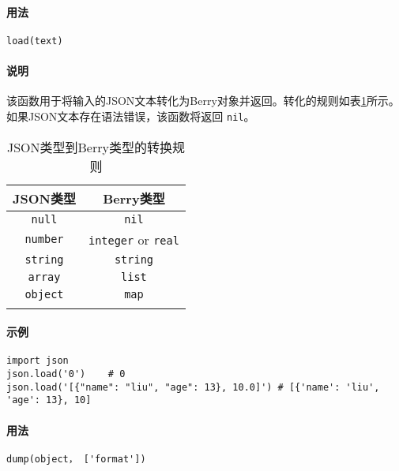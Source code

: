 \paragraph{用法}
\begin{lstlisting}[language=berry, numbers=none]
load(text)
\end{lstlisting}

\paragraph{说明}
该函数用于将输入的JSON文本转化为Berry对象并返回。转化的规则如表\ref{tab::json2berry_rule}所示。如果JSON文本存在语法错误，该函数将返回 \texttt{nil}。
\begin{table}[htb]
    \centering
    \setlength{\tabcolsep}{18mm}
    \begin{tabular}{cc} \Xhline{1pt}
        \textbf{JSON类型} & \textbf{Berry类型} \\ \hline
        \texttt{null} & \texttt{nil} \\
        \texttt{number} & \texttt{integer} or \texttt{real} \\
        \texttt{string} & \texttt{string} \\
        \texttt{array} & \texttt{list} \\
        \texttt{object} & \texttt{map} \\
        \Xhline{1pt}
    \end{tabular}
    \caption{JSON类型到Berry类型的转换规则}
    \label{tab::json2berry_rule}
\end{table}

\paragraph{示例}
\begin{lstlisting}[language=berry, numbers=none]
import json
json.load('0')    # 0
json.load('[{"name": "liu", "age": 13}, 10.0]') # [{'name': 'liu', 'age': 13}, 10]
\end{lstlisting}


\paragraph{用法}
\begin{lstlisting}[language=berry, numbers=none]
dump(object， ['format'])
\end{lstlisting}

